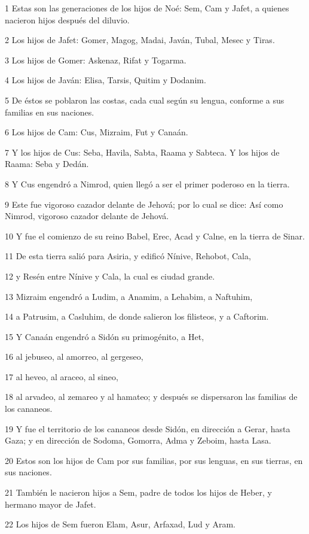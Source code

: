 \par 1 Estas son las generaciones de los hijos de Noé: Sem, Cam y Jafet, a quienes nacieron hijos después del diluvio.
\par 2 Los hijos de Jafet: Gomer, Magog, Madai, Javán, Tubal, Mesec y Tiras.
\par 3 Los hijos de Gomer: Askenaz, Rifat y Togarma.
\par 4 Los hijos de Javán: Elisa, Tarsis, Quitim y Dodanim.
\par 5 De éstos se poblaron las costas, cada cual según su lengua, conforme a sus familias en sus naciones.
\par 6 Los hijos de Cam: Cus, Mizraim, Fut y Canaán.
\par 7 Y los hijos de Cus: Seba, Havila, Sabta, Raama y Sabteca. Y los hijos de Raama: Seba y Dedán.
\par 8 Y Cus engendró a Nimrod, quien llegó a ser el primer poderoso en la tierra.
\par 9 Este fue vigoroso cazador delante de Jehová; por lo cual se dice: Así como Nimrod, vigoroso cazador delante de Jehová.
\par 10 Y fue el comienzo de su reino Babel, Erec, Acad y Calne, en la tierra de Sinar.
\par 11 De esta tierra salió para Asiria, y edificó Nínive, Rehobot, Cala,
\par 12 y Resén entre Nínive y Cala, la cual es ciudad grande.
\par 13 Mizraim engendró a Ludim, a Anamim, a Lehabim, a Naftuhim,
\par 14 a Patrusim, a Casluhim, de donde salieron los filisteos, y a Caftorim.
\par 15 Y Canaán engendró a Sidón su primogénito, a Het,
\par 16 al jebuseo, al amorreo, al gergeseo,
\par 17 al heveo, al araceo, al sineo,
\par 18 al arvadeo, al zemareo y al hamateo; y después se dispersaron las familias de los cananeos.
\par 19 Y fue el territorio de los cananeos desde Sidón, en dirección a Gerar, hasta Gaza; y en dirección de Sodoma, Gomorra, Adma y Zeboim, hasta Lasa.
\par 20 Estos son los hijos de Cam por sus familias, por sus lenguas, en sus tierras, en sus naciones.
\par 21 También le nacieron hijos a Sem, padre de todos los hijos de Heber, y hermano mayor de Jafet.
\par 22 Los hijos de Sem fueron Elam, Asur, Arfaxad, Lud y Aram.
